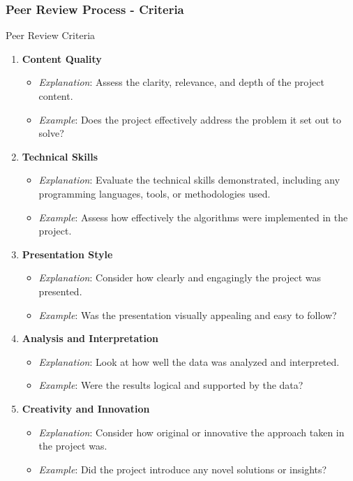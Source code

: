 \documentclass[aspectratio=169]{beamer}
\begin{document}
\begin{frame}[fragile]
  \frametitle{Peer Review Process - Criteria}
  \begin{block}{Peer Review Criteria}
    \begin{enumerate}
      \item \textbf{Content Quality}
        \begin{itemize}
          \item \textit{Explanation}: Assess the clarity, relevance, and depth of the project content.
          \item \textit{Example}: Does the project effectively address the problem it set out to solve?
        \end{itemize}
      \item \textbf{Technical Skills}
        \begin{itemize}
          \item \textit{Explanation}: Evaluate the technical skills demonstrated, including any programming languages, tools, or methodologies used.
          \item \textit{Example}: Assess how effectively the algorithms were implemented in the project.
        \end{itemize}
      \item \textbf{Presentation Style}
        \begin{itemize}
          \item \textit{Explanation}: Consider how clearly and engagingly the project was presented.
          \item \textit{Example}: Was the presentation visually appealing and easy to follow?
        \end{itemize}
      \item \textbf{Analysis and Interpretation}
        \begin{itemize}
          \item \textit{Explanation}: Look at how well the data was analyzed and interpreted.
          \item \textit{Example}: Were the results logical and supported by the data?
        \end{itemize}
      \item \textbf{Creativity and Innovation}
        \begin{itemize}
          \item \textit{Explanation}: Consider how original or innovative the approach taken in the project was.
          \item \textit{Example}: Did the project introduce any novel solutions or insights?
        \end{itemize}
    \end{enumerate}
  \end{block}
\end{frame}
\end{document}
